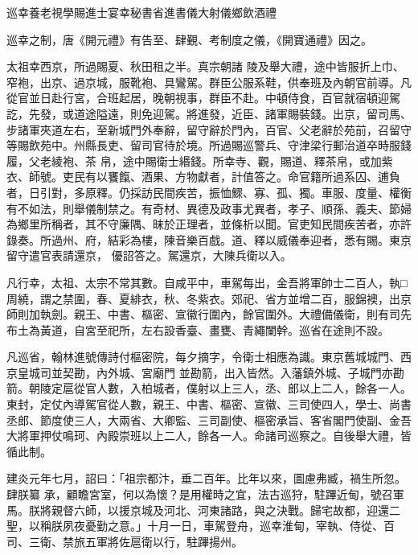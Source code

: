
\begin{pinyinscope}

 巡幸養老視學賜進士宴幸秘書省進書儀大射儀鄉飲酒禮



 巡幸之制，唐《開元禮》有告至、肆覲、考制度之儀，《開寶通禮》因之。



 太祖幸西京，所過賜夏、秋田租之半。真宗朝諸
 陵及舉大禮，途中皆服折上巾、窄袍，出京、過京城，服靴袍、具鸞駕。群臣公服系鞋，供奉班及內朝官前導。凡從官並日赴行宮，合班起居，晚朝視事，群臣不赴。中頓侍食，百官就宿頓迎駕訖，先發，或道途隘遠，則免迎駕。將進發，近臣、諸軍賜裝錢。出京，留司馬、步諸軍夾道左右，至新城門外奉辭，留守辭於門內，百官、父老辭於苑前，召留守等賜飲苑中。州縣長吏、留司官待於境。所過賜巡警兵、守津梁行郵治道卒時服錢履，父老綾袍、茶
 帛，途中賜衛士緡錢。所幸寺、觀，賜道、釋茶帛，或加紫衣、師號。吏民有以饔餼、酒果、方物獻者，計值答之。命官籍所過系囚、逋負者，日引對，多原釋。仍採訪民間疾苦，振恤鰥、寡、孤、獨。車服、度量、權衡有不如法，則舉儀制禁之。有奇材、異德及政事尤異者，孝子、順孫、義夫、節婦為鄉里所稱者，其不守廉隅、昧於正理者，並條析以聞。官吏知民間疾苦者，亦許錄奏。所過州、府，結彩為樓，陳音樂百戲。道、釋以威儀奉迎者，悉有賜。東京留守遣官表請還京，
 優詔答之。駕還京，大陳兵衛以入。



 凡行幸，太祖、太宗不常其數。自咸平中，車駕每出，金吾將軍帥士二百人，執□周繞，謂之禁圍，春、夏緋衣，秋、冬紫衣。郊祀、省方並增二百，服錦襖，出京師則加執劍。親王、中書、樞密、宣徽行圍內，餘官圍外。大禮備儀衛，則有司先布土為黃道，自宮至祀所，左右設香臺、畫甕、青繩闌幹。巡省在途則不設。



 凡巡省，翰林進號傳詩付樞密院，每夕摘字，令衛士相應為識。東京舊城城門、西京皇城司並契勘，內外城、宮廟門
 並勘箭，出入皆然。入藩鎮外城、子城門亦勘箭。朝陵定扈從官人數，入柏城者，僕射以上三人，丞、郎以上二人，餘各一人。東封，定仗內導駕官從人數，親王、中書、樞密、宣徽、三司使四人，學士、尚書丞郎、節度使三人，大兩省、大卿監、三司副使、樞密承旨、客省閣門使副、金吾大將軍押仗鳴珂、內殿崇班以上二人，餘各一人。命諸司巡察之。自後舉大禮，皆循此制。



 建炎元年七月，詔曰：「祖宗都汴，垂二百年。比年以來，圖慮弗臧，禍生所忽。肆朕纂
 承，顧瞻宮室，何以為懷？是用權時之宜，法古巡狩，駐蹕近甸，號召軍馬。朕將親督六師，以援京城及河北、河東諸路，與之決戰。歸宅故都，迎還二聖，以稱朕夙夜憂勤之意。」十月一日，車駕登舟，巡幸淮甸，宰執、侍從、百司、三衛、禁旅五軍將佐扈衛以行，駐蹕揚州。




\end{pinyinscope}
